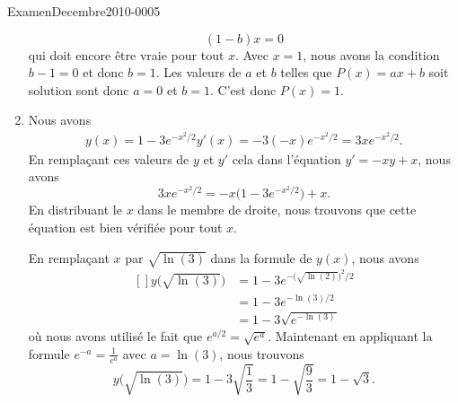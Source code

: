 \begin{corrige}{ExamenDecembre2010-0005}
\begin{enumerate}
			\begin{equation}
				(1-b)x=0
			\end{equation}
			qui doit encore être vraie pour tout $x$. Avec $x=1$, nous avons la condition $b-1=0$ et donc $b=1$. Les valeurs de $a$ et $b$ telles que $P(x)=ax+b$ soit solution sont donc $a=0$ et $b=1$. C'est donc $P(x)=1$.
		\item
			Nous avons
			\begin{subequations}
				\begin{align}
					y(x)=1-3 e^{-x^2/2}
					y'(x)=-3(-x) e^{-x^2/2}=3x e^{-x^2/2}.
				\end{align}
			\end{subequations}
			En remplaçant ces valeurs de $y$ et $y'$ cela dans l'équation $y'=-xy+x$, nous avons
			\begin{equation}
				3x e^{-x^2/2}=-x\big( 1-3 e^{-x^2/2} \big)+x.
			\end{equation}
			En distribuant le $x$ dans le membre de droite, nous trouvons que cette équation est bien vérifiée pour tout $x$.

			En remplaçant $x$ par $\sqrt{\ln(3)}$ dans la formule de $y(x)$, nous avons
			\begin{equation}
				\begin{aligned}[]
					y\big( \sqrt{\ln(3)} \big)&=1-3 e^{-\big( \sqrt{\ln(2)} \big)^2/2}\\
					&=1-3 e^{-\ln(3)/2}\\
					&=1-3\sqrt{ e^{-\ln(3)}}
				\end{aligned}
			\end{equation}
			où nous avons utilisé le fait que $ e^{a/2}=\sqrt{ e^{a}}$. Maintenant en appliquant la formule $ e^{-a}=\frac{1}{  e^{a} }$ avec $a=\ln(3)$, nous trouvons
			\begin{equation}
				y\big( \sqrt{\ln(3)} \big)=1-3\sqrt{\frac{ 1 }{ 3 }}=1-\sqrt{\frac{ 9 }{ 3 }}=1-\sqrt{3}.
			\end{equation}
	\end{enumerate}

\end{corrige}

